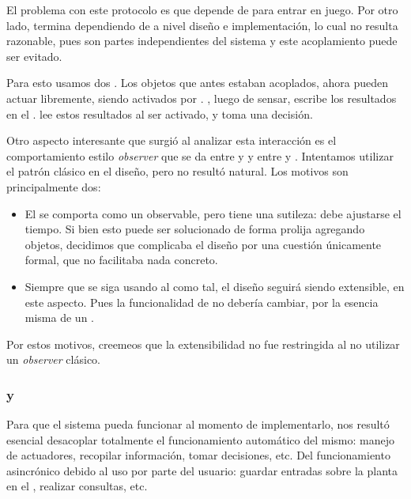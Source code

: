           El problema con este protocolo es que \decisiones{} depende de \condiciones{}
          para entrar en juego. Por otro lado, \condiciones{} termina dependiendo de
          \condiciones{} a nivel dise\~no e implementaci\'on, lo cual no resulta razonable,
          pues son partes independientes del sistema y este acoplamiento puede ser evitado.

          Para esto usamos dos \timer{}. Los objetos que antes estaban acoplados, ahora
          pueden actuar libremente, siendo activados por \timer{}. \condiciones{}, luego
          de sensar, escribe los resultados en el \historial{}. \decisiones{} lee estos
          resultados al ser activado, y toma una decisi\'on.

          Otro aspecto interesante que surgi\'o al analizar esta interacci\'on es
          el comportamiento estilo \textit{observer} que se da entre \timer{} y
          \condiciones{} y entre \timer{} y \decisiones{}. Intentamos utilizar el patr\'on
          cl\'asico en el dise\~no, pero no result\'o natural. Los motivos son
          principalmente dos:
          \begin{itemize}
              \item El \timer{} se comporta como un observable, pero tiene una sutileza:
                  debe ajustarse el tiempo. Si bien esto puede ser solucionado de
                  forma prolija agregando objetos, decidimos que complicaba el dise\~no
                  por una cuesti\'on \'unicamente formal, que no facilitaba nada
                  concreto.
              \item Siempre que se siga usando al \timer{} como tal, el dise\~no seguir\'a
                  siendo extensible, en este aspecto. Pues la funcionalidad de \timer{}
                  no deber\'ia cambiar, por la esencia misma de un \timer{}.
          \end{itemize}
          Por estos motivos, creemeos que la extensibilidad no fue restringida al
          no utilizar un \textit{observer} cl\'asico.

      \subsubsection{\cliente{} y \servidor{}}
          Para que el sistema pueda funcionar al momento de implementarlo, nos result\'o esencial
          desacoplar totalmente el funcionamiento autom\'atico del mismo: manejo de
          actuadores, recopilar informaci\'on, tomar decisiones, etc. Del funcionamiento
          asincr\'onico debido al uso por parte del usuario: guardar entradas sobre la
          planta en el \historial{}, realizar consultas, etc.

